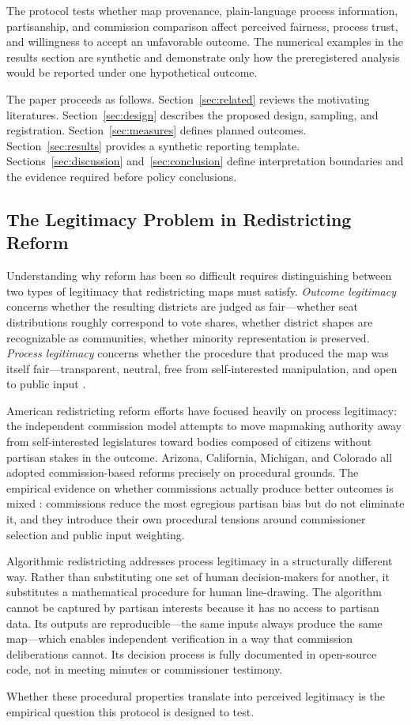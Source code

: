 The protocol tests whether map provenance, plain-language process information,
partisanship, and commission comparison affect perceived fairness, process
trust, and willingness to accept an unfavorable outcome. The numerical examples
in the results section are synthetic and demonstrate only how the preregistered
analysis would be reported under one hypothetical outcome.

The paper proceeds as follows. Section~\ref{sec:related} reviews the motivating
literatures. Section~\ref{sec:design} describes the proposed design, sampling,
and registration. Section~\ref{sec:measures} defines planned outcomes.
Section~\ref{sec:results} provides a synthetic reporting template.
Sections~\ref{sec:discussion} and~\ref{sec:conclusion} define interpretation
boundaries and the evidence required before policy conclusions.

\subsection{The Legitimacy Problem in Redistricting Reform}

Understanding why reform has been so difficult requires distinguishing between two types of legitimacy that redistricting maps must satisfy. \textit{Outcome legitimacy} concerns whether the resulting districts are judged as fair---whether seat distributions roughly correspond to vote shares, whether district shapes are recognizable as communities, whether minority representation is preserved. \textit{Process legitimacy} concerns whether the procedure that produced the map was itself fair---transparent, neutral, free from self-interested manipulation, and open to public input \citep{tyler2006legitimacy}.

American redistricting reform efforts have focused heavily on process legitimacy: the independent commission model attempts to move mapmaking authority away from self-interested legislatures toward bodies composed of citizens without partisan stakes in the outcome. Arizona, California, Michigan, and Colorado all adopted commission-based reforms precisely on procedural grounds. The empirical evidence on whether commissions actually produce better outcomes is mixed \citep{imig2022,kousser2013,stephanopoulos2015}: commissions reduce the most egregious partisan bias but do not eliminate it, and they introduce their own procedural tensions around commissioner selection and public input weighting.

Algorithmic redistricting addresses process legitimacy in a structurally different way. Rather than substituting one set of human decision-makers for another, it substitutes a mathematical procedure for human line-drawing. The algorithm cannot be captured by partisan interests because it has no access to partisan data. Its outputs are reproducible---the same inputs always produce the same map---which enables independent verification in a way that commission deliberations cannot. Its decision process is fully documented in open-source code, not in meeting minutes or commissioner testimony.

Whether these procedural properties translate into perceived legitimacy is the
empirical question this protocol is designed to test.
